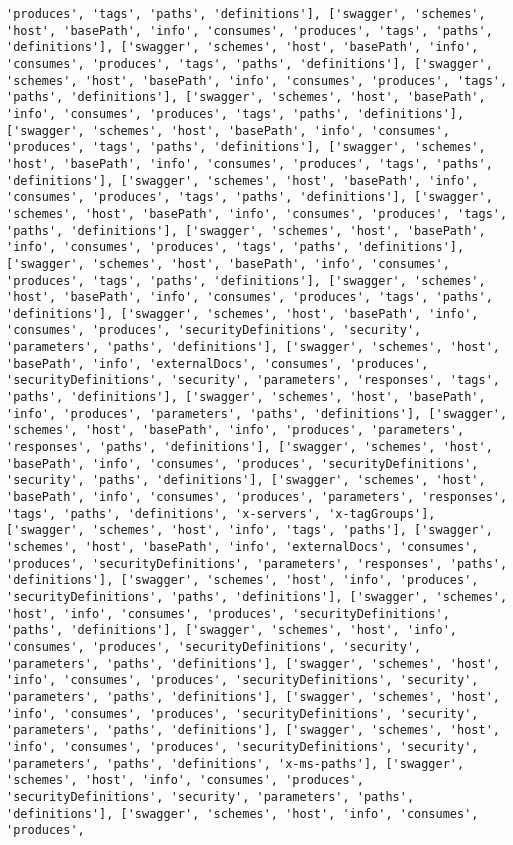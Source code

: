 \documentclass[11pt]{article}
\begin{document}
\begin{Verbatim}[commandchars=\\\{\}]
'produces', 'tags', 'paths', 'definitions'], ['swagger', 'schemes', 'host', 'basePath', 'info', 'consumes', 'produces', 'tags', 'paths', 'definitions'], ['swagger', 'schemes', 'host', 'basePath', 'info', 'consumes', 'produces', 'tags', 'paths', 'definitions'], ['swagger', 'schemes', 'host', 'basePath', 'info', 'consumes', 'produces', 'tags', 'paths', 'definitions'], ['swagger', 'schemes', 'host', 'basePath', 'info', 'consumes', 'produces', 'tags', 'paths', 'definitions'], ['swagger', 'schemes', 'host', 'basePath', 'info', 'consumes', 'produces', 'tags', 'paths', 'definitions'], ['swagger', 'schemes', 'host', 'basePath', 'info', 'consumes', 'produces', 'tags', 'paths', 'definitions'], ['swagger', 'schemes', 'host', 'basePath', 'info', 'consumes', 'produces', 'tags', 'paths', 'definitions'], ['swagger', 'schemes', 'host', 'basePath', 'info', 'consumes', 'produces', 'tags', 'paths', 'definitions'], ['swagger', 'schemes', 'host', 'basePath', 'info', 'consumes', 'produces', 'tags', 'paths', 'definitions'], ['swagger', 'schemes', 'host', 'basePath', 'info', 'consumes', 'produces', 'tags', 'paths', 'definitions'], ['swagger', 'schemes', 'host', 'basePath', 'info', 'consumes', 'produces', 'tags', 'paths', 'definitions'], ['swagger', 'schemes', 'host', 'basePath', 'info', 'consumes', 'produces', 'securityDefinitions', 'security', 'parameters', 'paths', 'definitions'], ['swagger', 'schemes', 'host', 'basePath', 'info', 'externalDocs', 'consumes', 'produces', 'securityDefinitions', 'security', 'parameters', 'responses', 'tags', 'paths', 'definitions'], ['swagger', 'schemes', 'host', 'basePath', 'info', 'produces', 'parameters', 'paths', 'definitions'], ['swagger', 'schemes', 'host', 'basePath', 'info', 'produces', 'parameters', 'responses', 'paths', 'definitions'], ['swagger', 'schemes', 'host', 'basePath', 'info', 'consumes', 'produces', 'securityDefinitions', 'security', 'paths', 'definitions'], ['swagger', 'schemes', 'host', 'basePath', 'info', 'consumes', 'produces', 'parameters', 'responses', 'tags', 'paths', 'definitions', 'x-servers', 'x-tagGroups'], ['swagger', 'schemes', 'host', 'info', 'tags', 'paths'], ['swagger', 'schemes', 'host', 'basePath', 'info', 'externalDocs', 'consumes', 'produces', 'securityDefinitions', 'parameters', 'responses', 'paths', 'definitions'], ['swagger', 'schemes', 'host', 'info', 'produces', 'securityDefinitions', 'paths', 'definitions'], ['swagger', 'schemes', 'host', 'info', 'consumes', 'produces', 'securityDefinitions', 'paths', 'definitions'], ['swagger', 'schemes', 'host', 'info', 'consumes', 'produces', 'securityDefinitions', 'security', 'parameters', 'paths', 'definitions'], ['swagger', 'schemes', 'host', 'info', 'consumes', 'produces', 'securityDefinitions', 'security', 'parameters', 'paths', 'definitions'], ['swagger', 'schemes', 'host', 'info', 'consumes', 'produces', 'securityDefinitions', 'security', 'parameters', 'paths', 'definitions'], ['swagger', 'schemes', 'host', 'info', 'consumes', 'produces', 'securityDefinitions', 'security', 'parameters', 'paths', 'definitions', 'x-ms-paths'], ['swagger', 'schemes', 'host', 'info', 'consumes', 'produces', 'securityDefinitions', 'security', 'parameters', 'paths', 'definitions'], ['swagger', 'schemes', 'host', 'info', 'consumes', 'produces', 
\end{Verbatim}
\end{document}
